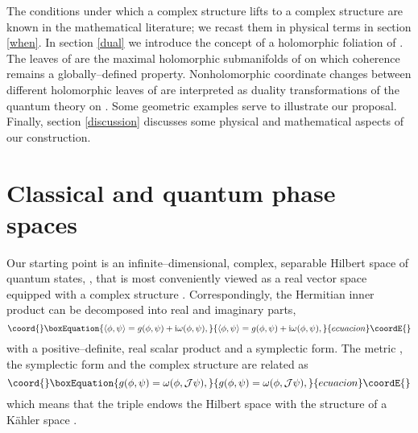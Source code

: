 \documentclass[a4paper,a4paper]{article}
\begin{document}
The conditions under which a complex structure \coordHE{} lifts to a complex 
structure \coordHE{} are known in the mathematical literature; 
we recast them in physical terms in section \ref{when}. In section \ref{dual} 
we introduce the concept of a holomorphic foliation \coordHE{} of \coordHE{}. 
The leaves of \coordHE{} are the maximal holomorphic submanifolds of \coordHE{} 
on which coherence remains a globally--defined property. Nonholomorphic coordinate 
changes between different holomorphic leaves of \coordHE{} are interpreted as duality 
transformations of the quantum theory on \coordHE{}. Some geometric examples serve 
to illustrate our proposal. Finally, section \ref{discussion} 
discusses some physical and mathematical aspects of our construction.

\section{Classical and quantum phase spaces}\label{clqu}

Our starting point is an infinite--dimensional, complex, separable Hilbert space 
of quantum states, \coordHE{}, that is most conveniently viewed as a real vector 
space equipped with a complex structure \coordHE{}. Correspondingly, 
the Hermitian inner product can be decomposed into real and imaginary parts,
\begin{equation}\coord{}\boxEquation{
\langle\phi,\psi\rangle = g(\phi,\psi) + {\rm i}\omega(\phi,\psi),
\label{dec}
}{
\langle\phi,\psi\rangle = g(\phi,\psi) + {\rm i}\omega(\phi,\psi),
}{ecuacion}\coordE{}\end{equation}
with \coordHE{} a positive--definite, real scalar product and \myHighlight{$\omega$}\coordHE{} a symplectic form.
The metric \coordHE{}, the symplectic form \myHighlight{$\omega$}\coordHE{} and the complex structure 
\coordHE{} are related as
\begin{equation}\coord{}\boxEquation{
g(\phi,\psi)=\omega(\phi,{\cal J}\psi),
\label{kah}
}{
g(\phi,\psi)=\omega(\phi,{\cal J}\psi),
}{ecuacion}\coordE{}\end{equation}
which means that the triple \coordHE{} endows the Hilbert space 
\coordHE{} with the structure of a K\"ahler space \cite{KN}. 
\end{document}
